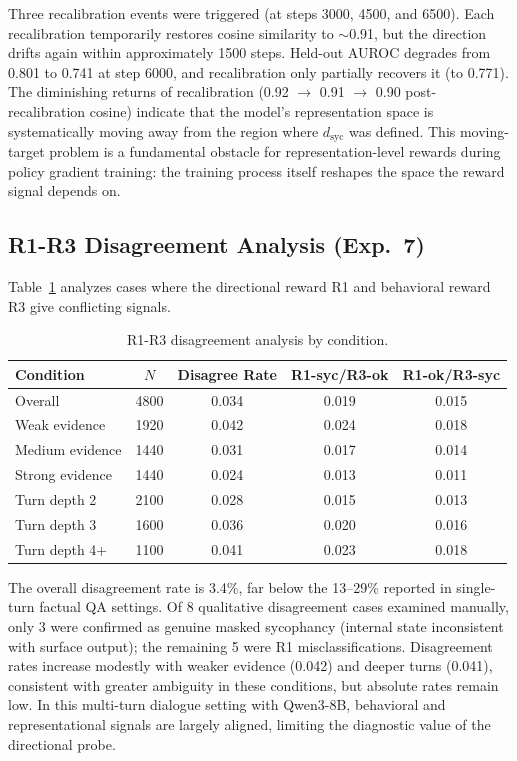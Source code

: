 \documentclass[11pt,a4paper]{article}
\newcommand{\dsyc}{$d_{\text{syc}}$}
\begin{document}
Three recalibration events were triggered (at steps 3000, 4500, and 6500). Each recalibration temporarily restores cosine similarity to $\sim$0.91, but the direction drifts again within approximately 1500 steps. Held-out AUROC degrades from 0.801 to 0.741 at step 6000, and recalibration only partially recovers it (to 0.771). The diminishing returns of recalibration (0.92 $\to$ 0.91 $\to$ 0.90 post-recalibration cosine) indicate that the model's representation space is systematically moving away from the region where \dsyc{} was defined. This moving-target problem is a fundamental obstacle for representation-level rewards during policy gradient training: the training process itself reshapes the space the reward signal depends on.

\subsection{R1-R3 Disagreement Analysis (Exp.\ 7)}
\label{sec:exp7}

Table~\ref{tab:disagreement} analyzes cases where the directional reward R1 and behavioral reward R3 give conflicting signals.

\begin{table}[h]
\centering
\small
\caption{R1-R3 disagreement analysis by condition.}
\label{tab:disagreement}
\begin{tabular}{lcccc}
\toprule
Condition & $N$ & Disagree Rate & R1-syc/R3-ok & R1-ok/R3-syc \\
\midrule
Overall         & 4800 & 0.034 & 0.019 & 0.015 \\
Weak evidence   & 1920 & 0.042 & 0.024 & 0.018 \\
Medium evidence & 1440 & 0.031 & 0.017 & 0.014 \\
Strong evidence & 1440 & 0.024 & 0.013 & 0.011 \\
Turn depth 2    & 2100 & 0.028 & 0.015 & 0.013 \\
Turn depth 3    & 1600 & 0.036 & 0.020 & 0.016 \\
Turn depth 4+   & 1100 & 0.041 & 0.023 & 0.018 \\
\bottomrule
\end{tabular}
\end{table}

The overall disagreement rate is 3.4\%, far below the 13--29\% reported in single-turn factual QA settings. Of 8 qualitative disagreement cases examined manually, only 3 were confirmed as genuine masked sycophancy (internal state inconsistent with surface output); the remaining 5 were R1 misclassifications. Disagreement rates increase modestly with weaker evidence (0.042) and deeper turns (0.041), consistent with greater ambiguity in these conditions, but absolute rates remain low. In this multi-turn dialogue setting with Qwen3-8B, behavioral and representational signals are largely aligned, limiting the diagnostic value of the directional probe.
\end{document}
